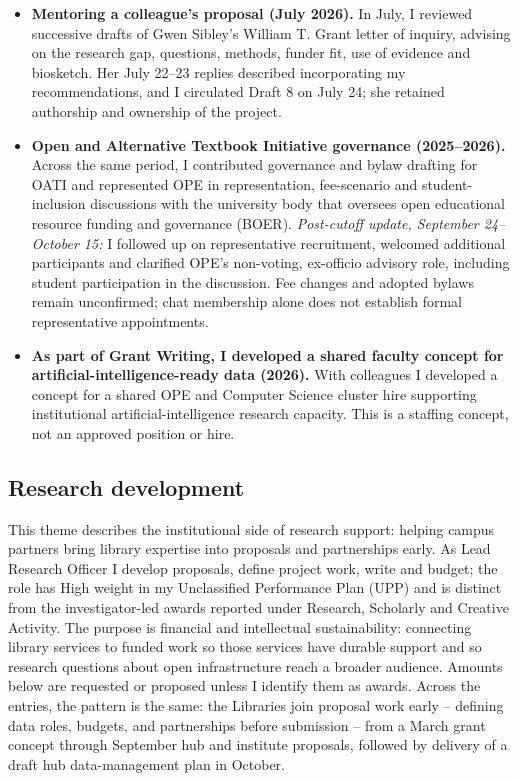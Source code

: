\begin{itemize}
\item \textbf{Mentoring a colleague's proposal (July 2026).} In July, I reviewed successive drafts of Gwen Sibley's William T. Grant letter of inquiry, advising on the research gap, questions, methods, funder fit, use of evidence and biosketch. Her July 22--23 replies described incorporating my recommendations, and I circulated Draft 8 on July 24; she retained authorship and ownership of the project.
\item \textbf{Open and Alternative Textbook Initiative governance (2025--2026).}\label{update-boer} Across the same period, I contributed governance and bylaw drafting for OATI and represented OPE in representation, fee-scenario and student-inclusion discussions with the university body that oversees open educational resource funding and governance (BOER). \textit{Post-cutoff update, September 24--October 15:} I followed up on representative recruitment, welcomed additional participants and clarified OPE's non-voting, ex-officio advisory role, including student participation in the discussion. Fee changes and adopted bylaws remain unconfirmed; chat membership alone does not establish formal representative appointments.
\item \textbf{As part of Grant Writing, I developed a shared faculty concept for artificial-intelligence-ready data (2026).} With colleagues I developed a concept for a shared OPE and Computer Science cluster hire supporting institutional artificial-intelligence research capacity. This is a staffing concept, not an approved position or hire.
\end{itemize}

\subsection{Research development}
This theme describes the institutional side of research support: helping campus partners bring library expertise into proposals and partnerships early. As Lead Research Officer I develop proposals, define project work, write and budget; the role has High weight in my Unclassified Performance Plan (UPP) and is distinct from the investigator-led awards reported under Research, Scholarly and Creative Activity. The purpose is financial and intellectual sustainability: connecting library services to funded work so those services have durable support and so research questions about open infrastructure reach a broader audience. Amounts below are requested or proposed unless I identify them as awards. Across the entries, the pattern is the same: the Libraries join proposal work early -- defining data roles, budgets, and partnerships before submission -- from a March grant concept through September hub and institute proposals, followed by delivery of a draft hub data-management plan in October.

